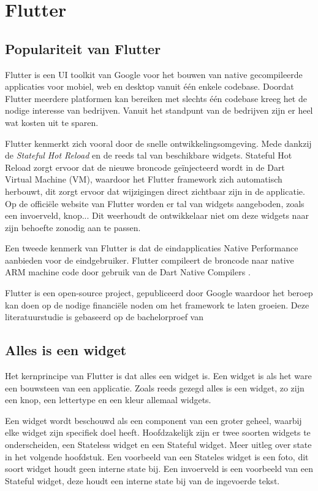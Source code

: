 \section{Flutter}
\subsection{Populariteit van Flutter}
Flutter is een UI toolkit van Google voor het bouwen van native gecompileerde applicaties voor mobiel, web en desktop vanuit één enkele codebase. Doordat Flutter meerdere platformen kan bereiken met slechts één codebase kreeg het de nodige interesse van bedrijven. Vanuit het standpunt van de bedrijven zijn er heel wat kosten uit te sparen.

Flutter kenmerkt zich vooral door de snelle ontwikkelingsomgeving. Mede dankzij de \emph{Stateful Hot Reload} en de reeds tal van beschikbare widgets. Stateful Hot Reload zorgt ervoor dat de nieuwe broncode geïnjecteerd wordt in de Dart Virtual Machine (VM), waardoor het Flutter framework zich automatisch herbouwt, dit zorgt ervoor dat wijzigingen direct zichtbaar zijn in de applicatie. Op de officiële website van Flutter worden er tal van widgets aangeboden, zoals een invoerveld, knop... Dit weerhoudt de ontwikkelaar niet om deze widgets naar zijn behoefte zonodig aan te passen.

Een tweede kenmerk van Flutter is dat de eindapplicaties Native Performance aanbieden voor de eindgebruiker. Flutter compileert de broncode naar native ARM machine code door gebruik van de Dart Native Compilers \autocite{Dart}.

Flutter is een open-source project, gepubliceerd door Google waardoor het beroep kan doen op de nodige financiële noden om het framework te laten groeien. 
Deze literatuurstudie is gebaseerd op de bachelorproef van \autocite{Coninck2019}

\subsection{Alles is een widget}
Het kernprincipe van Flutter is dat alles een widget is. Een widget is als het ware een bouwsteen van een applicatie. Zoals reeds gezegd alles is een widget, zo zijn een knop, een lettertype en een kleur allemaal widgets. 

Een widget wordt beschouwd als een component van een groter geheel, waarbij elke widget zijn specifiek doel heeft.
Hoofdzakelijk zijn er twee soorten widgets te onderscheiden, een Stateless widget en een Stateful widget. Meer uitleg over state in het volgende hoofdstuk. Een voorbeeld van een Stateles widget is een foto, dit soort widget houdt geen interne state bij. Een invoerveld is een voorbeeld van een Stateful widget, deze houdt een interne state bij van de ingevoerde tekst. 
\newline

